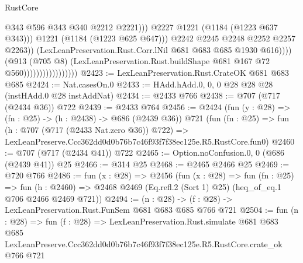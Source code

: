 \begin{lexlean}{RustCore}
\begin{coremodule}
                                                      @343
                                                      @596
                                                      @343
                                                      @340
                                                      @2212
                                                      @2221)))
                                                @2227
                                                @1221
                                                (@1184 (@1223 @637 @343)))
                                              @1221
                                              (@1184 (@1223 @625 @647)))
                                            @2242
                                            @2245
                                            @2248
                                            @2252
                                            @2257
                                            @2263))
                                        (LexLeanPreservation.Rust.Corr.lNil
                                          @681
                                          @683
                                          @685
                                          @1930
                                          @616))))
                                  (@913
                                    (@705 @8)
                                    (LexLeanPreservation.Rust.buildShape
                                      @681
                                      @167
                                      @72
                                      @560)))))))))))))))))
@2423 := LexLeanPreservation.Rust.CrateOK @681 @683 @685
@2424 := Nat.casesOn.{0}
@2433 := HAdd.hAdd.{0, 0, 0} @28 @28 @28 (instHAdd.{0} @28 instAddNat)
@2434 := @2433 @766
@2438 := @707 (@717 (@2434 @36)) @722
@2439 := @2433 @764
@2456 := @2424
    (fun (y : @28) => (fn : @25) -> (h : @2438) -> @686 (@2439 @36))
    @721
    (fun (fn : @25) =>
    fun (h : @707 (@717 (@2433 Nat.zero @36)) @722) =>
    LexLeanPreserve.Ccc362dd0d0b76b7c46f93f7f38ec125e.R5.RustCore.fun0)
@2460 := @707 (@717 (@2434 @41)) @722
@2465 := Option.noConfusion.{0, 0} (@686 (@2439 @41)) @25
@2466 := @314 @25
@2468 := @2465 @2466 @25
@2469 := @720 @766
@2486 := fun (x : @28) =>
  @2456
    (fun (x : @28) =>
    fun (fn : @25) =>
    fun (h : @2460) => @2468 @2469 (Eq.refl.{2} (Sort 1) @25) (heq_of_eq.{1} @706 @2466 @2469 @721))
@2494 := (n : @28) -> (f : @28) -> LexLeanPreservation.Rust.FunSem @681 @683 @685 @766 @721
@2504 := fun (n : @28) =>
  fun (f : @28) =>
  LexLeanPreservation.Rust.simulate
    @681
    @683
    @685
    LexLeanPreserve.Ccc362dd0d0b76b7c46f93f7f38ec125e.R5.RustCore.crate_ok
    @766
    @721
\end{coremodule}
\end{lexlean}
